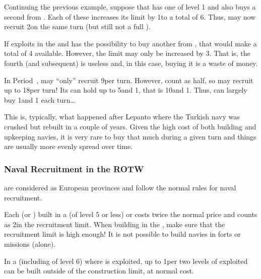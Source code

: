 \begin{exemple}[Wood]
  Continuing the previous example, suppose that \SUE has one  \MNU
  of level 1 and also buys a second  from \ANG. Each of these
   increases its limit by 1\ND to a total of 6\ND. Thus, \SUE may
  now recruit 2\FLEET\Facemoins on the same turn (but still not a full
  \FLEET\Faceplus).

  If \SUE exploits  in the \ROTW and has the possibility to buy
  another  from \POL, that would make a total of 4 
  available. However, the limit may only be increased by 3\ND. That is, the
  fourth (and subsequent)  is useless and, in this case, buying it
  is a waste of money.
\end{exemple}

\begin{exemple}[Galleys]
  In Period~, \TUR may ``only'' recruit 9\ND per turn. However,
  \NGD count as half, so \TUR may recruit up to 18\NGD per turn! Its
  \FLEET\Faceplus can hold up to 5\ND and 1\NTD, that is 10\NGD and
  1\NTD. Thus, \TUR can largely buy 1\FLEET\Faceplus and 1\FLEET\Facemoins
  each turn\ldots

  This is, typically, what happened after Lepanto where the Turkish navy was
  crushed but rebuilt in a couple of years. Given the high cost of both
  building and upkeeping navies, it is very rare to buy that much \ND during a
  given turn and things are usually more evenly spread over time.
\end{exemple}

\subsubsection{Naval Recruitment in the ROTW}
 are considered as European provinces and follow the
normal rules for naval recruitment.

 Each \ND (or \NTD) built in a \COL (of level
5 or less) or \TP costs twice the normal price and counts as 2\ND in the
recruitment limit.
\bparag When building \FLEET\Facemoins in the \ROTW, make sure that the
recruitment limit is high enough!
\bparag It is not possible to build navies in forts or missions (alone).

\aparag[Fisheries]\label{chLogistic:Effect of Fish Purchase} In a \COL
(including of level 6) where  is exploited, up to 1\NDE per two
levels of  exploited can be built outside of the construction limit,
at normal cost.


